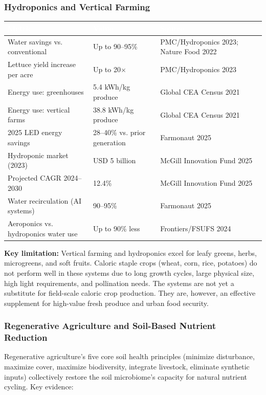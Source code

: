 \documentclass[11pt,letterpaper]{article}
\newcommand{\tableheader}[1]{\textbf{\sffamily\textcolor{white}{#1}}}
\begin{document}
\subsubsection{Hydroponics and Vertical Farming}

\begin{center}
\begin{tabularx}{\textwidth}{L{4cm}L{3cm}X}
\toprule
{}
\tableheader{Metric} & \tableheader{Value} & \tableheader{Source} \\
\midrule
Water savings vs. conventional & Up to 90--95\% & PMC/Hydroponics 2023; Nature Food 2022 \\
Lettuce yield increase per acre & Up to 20$\times$ & PMC/Hydroponics 2023 \\
Energy use: greenhouses & 5.4 kWh/kg produce & Global CEA Census 2021 \\
Energy use: vertical farms & 38.8 kWh/kg produce & Global CEA Census 2021 \\
2025 LED energy savings & 28--40\% vs. prior generation & Farmonaut 2025 \\
Hydroponic market (2023) & USD 5 billion & McGill Innovation Fund 2025 \\
Projected CAGR 2024--2030 & 12.4\% & McGill Innovation Fund 2025 \\
Water recirculation (AI systems) & 90--95\% & Farmonaut 2025 \\
Aeroponics vs. hydroponics water use & Up to 90\% less & Frontiers/FSUFS 2024 \\
\bottomrule
\end{tabularx}
\end{center}

\textbf{Key limitation:} Vertical farming and hydroponics excel for leafy greens, herbs, microgreens, and soft fruits. Caloric staple crops (wheat, corn, rice, potatoes) do not perform well in these systems due to long growth cycles, large physical size, high light requirements, and pollination needs. The systems are not yet a substitute for field-scale caloric crop production. They are, however, an effective supplement for high-value fresh produce and urban food security.

\subsubsection{Regenerative Agriculture and Soil-Based Nutrient Reduction}

Regenerative agriculture's five core soil health principles (minimize disturbance, maximize cover, maximize biodiversity, integrate livestock, eliminate synthetic inputs) collectively restore the soil microbiome's capacity for natural nutrient cycling. Key evidence:
\end{document}
